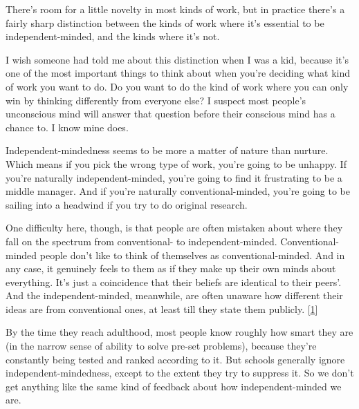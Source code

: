 There's room for a
                  little novelty in most kinds of work, but in practice there's
                  a fairly sharp distinction between the kinds of work where
                  it's essential to be independent-minded, and the kinds where
                  it's not.

I wish someone had told me about this
                  distinction when I was a kid, because it's one of the most
                  important things to think about when you're deciding what kind
                  of work you want to do. Do you want to do the kind of work
                  where you can only win by thinking differently from everyone
                  else? I suspect most people's unconscious mind will answer
                  that question before their conscious mind has a chance to. I
                  know mine does.

Independent-mindedness seems to be
                  more a matter of nature than nurture. Which means if you pick
                  the wrong type of work, you're going to be unhappy. If you're
                  naturally independent-minded, you're going to find it
                  frustrating to be a middle manager. And if you're naturally
                  conventional-minded, you're going to be sailing into a
                  headwind if you try to do original research.

One
                  difficulty here, though, is that people are often mistaken
                  about where they fall on the spectrum from conventional- to
                  independent-minded. Conventional-minded people don't like to
                  think of themselves as conventional-minded. And in any case,
                  it genuinely feels to them as if they make up their own minds
                  about everything. It's just a coincidence that their beliefs
                  are identical to their peers'. And the independent-minded,
                  meanwhile, are often unaware how different their ideas are
                  from conventional ones, at least till they state them
                  publicly.
                  [\href{\#f1n}{1}]

By the time they reach adulthood, most people
                  know roughly how smart they are (in the narrow sense of
                  ability to solve pre-set problems), because they're constantly
                  being tested and ranked according to it. But schools generally
                  ignore independent-mindedness, except to the extent they try
                  to suppress it. So we don't get anything like the same kind of
                  feedback about how independent-minded we are.

